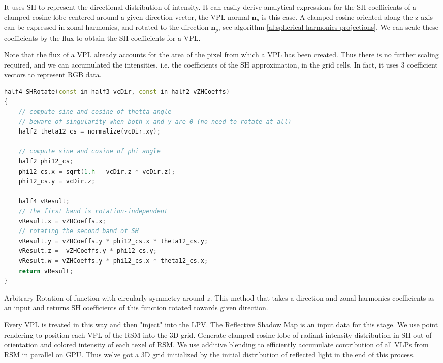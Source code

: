 It uses SH to represent the directional distribution of intensity. It can easily derive analytical expressions for the SH coefficients of a clamped cosine-lobe centered around a given direction vector, the VPL normal $\mathbf{n}_p$ is this case. A clamped cosine oriented along the z-axis can be expressed in zonal harmonics\cite{a:Ontherelationshipbetweenradianceandirradiance:determiningtheillumina-tionfromimagesofaconvexlambertianobject.}, and rotated to the direction $\mathbf{n}_p$, see algorithm \ref{al:spherical-harmonics-projections}. We can scale these coefficients by the flux to obtain the SH coefficients for a VPL.

Note that the flux of a VPL already accounts for the area of the pixel from which a VPL has been created. Thus there is no further scaling required, and we can accumulated the intensities, i.e. the coefficients of the SH approximation, in the grid cells. In fact, it uses 3 coefficient vectors to represent RGB data.

\begin{algorithm}\label{al:spherical-harmonics-projections}
\begin{lstlisting}[language=C++]
half4 SHRotate(const in half3 vcDir, const in half2 vZHCoeffs)
{
	// compute sine and cosine of thetta angle
	// beware of singularity when both x and y are 0 (no need to rotate at all) 
	half2 theta12_cs = normalize(vcDir.xy);
 	
	// compute sine and cosine of phi angle
	half2 phi12_cs;
	phi12_cs.x = sqrt(1.h - vcDir.z * vcDir.z); 
	phi12_cs.y = vcDir.z;
	
	half4 vResult;
	// The first band is rotation-independent
	vResult.x = vZHCoeffs.x;
	// rotating the second band of SH
	vResult.y = vZHCoeffs.y * phi12_cs.x * theta12_cs.y; 
	vResult.z = -vZHCoeffs.y * phi12_cs.y;
	vResult.w = vZHCoeffs.y * phi12_cs.x * theta12_cs.x;
	return vResult;
}                                                                              
\end{lstlisting}	
\caption{Arbitrary Rotation of function with circularly symmetry around $z$. This method that takes a direction and zonal harmonics coefficients as an input and returns SH coefficients of this function rotated towards given direction.}
\end{algorithm}

Every VPL is treated in this way and then "inject" into the LPV. The Reflective Shadow Map is an input data for this stage. We use point rendering to position each VPL of the RSM into the 3D grid. Generate clamped cosine lobe of radiant intensity distribution in SH out of orientation and colored intensity of each texel of RSM. We use additive blending to efficiently accumulate contribution of all VLPs from RSM in parallel on GPU. Thus we've got a 3D grid initialized by the initial distribution of reflected light in the end of this process.

